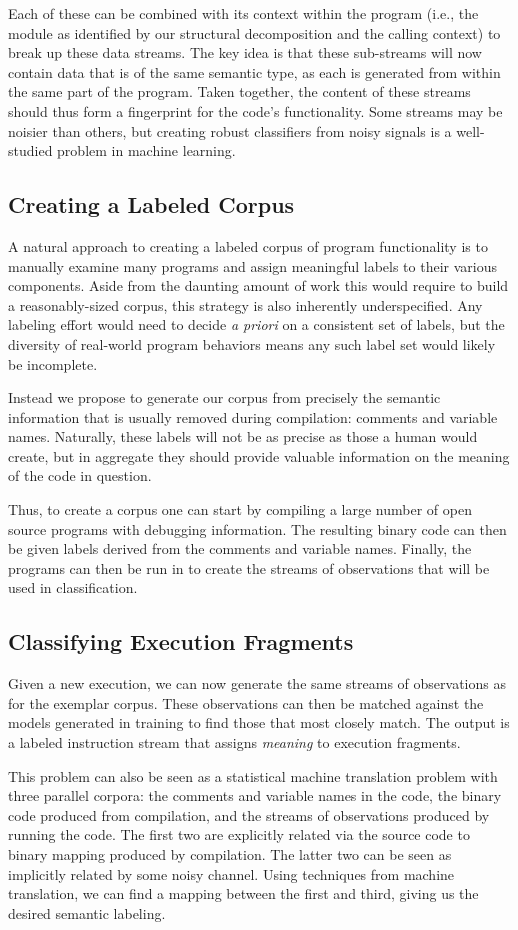Each of these can be combined with its context within the program (i.e.,
the module as identified by our structural decomposition and the calling
context) to break up these data streams. The key idea is that these
sub-streams will now contain data that is of the same semantic type, as
each is generated from within the same part of the program. Taken
together, the content of these streams should thus form a fingerprint
for the code's functionality. Some streams may be noisier than others,
but creating robust classifiers from noisy signals is a well-studied
problem in machine learning.

\subsection{Creating a Labeled Corpus}

A natural approach to creating a labeled corpus of program functionality
is to manually examine many programs and assign meaningful labels to
their various components. Aside from the daunting amount of work this
would require to build a reasonably-sized corpus, this strategy is also
inherently underspecified. Any labeling effort would need to decide
\emph{a priori} on a consistent set of labels, but the diversity of
real-world program behaviors means any such label set would likely be
incomplete.

Instead we propose to generate our corpus from precisely the semantic
information that is usually removed during compilation: comments and
variable names. Naturally, these labels will not be as precise as those
a human would create, but in aggregate they should provide valuable
information on the meaning of the code in question.

Thus, to create a corpus one can start by compiling a large number of
open source programs with debugging information. The resulting binary
code can then be given labels derived from the comments and variable
names. Finally, the programs can then be run in \dynamicsys to create
the streams of observations that will be used in classification.

\subsection{Classifying Execution Fragments}

Given a new execution, we can now generate the same streams of
observations as for the exemplar corpus. These observations can then be
matched against the models generated in training to find those that most
closely match. The output is a labeled instruction stream that assigns
\emph{meaning} to execution fragments.

This problem can also be seen as a statistical machine translation
problem with three parallel corpora: the comments and variable names in
the code, the binary code produced from compilation, and the streams of
observations produced by running the code. The first two are explicitly
related via the source code to binary mapping produced by compilation.
The latter two can be seen as implicitly related by some noisy channel.
Using techniques from machine translation, we can find a mapping between
the first and third, giving us the desired semantic labeling.
